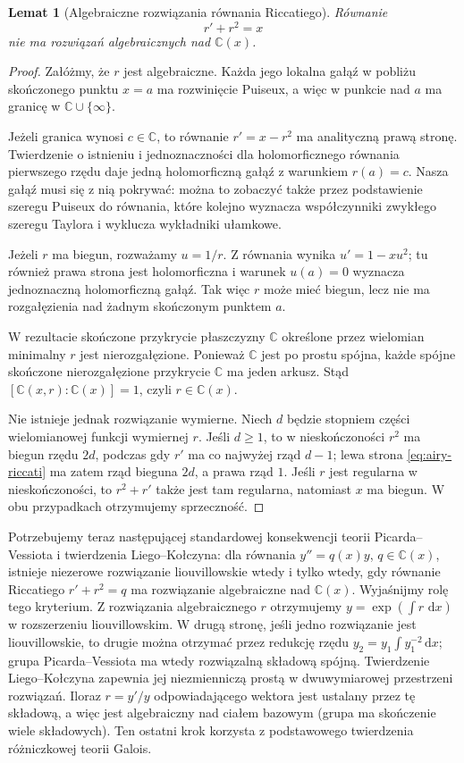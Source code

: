 \documentclass[11pt,a4paper,oneside]{book}
\numberwithin{equation}{section}
\theoremstyle{plain}
\newtheorem{lemat}[twierdzenie]{Lemat}
\theoremstyle{definition}
\theoremstyle{remark}
\newcommand{\C}{\mathbb{C}}
\newcommand{\dd}{\,\mathrm{d}}
\begin{document}
\begin{lemat}[Algebraiczne rozwiązania równania Riccatiego]
Równanie
\begin{equation}\label{eq:airy-riccati}
r'+r^2=x
\end{equation}
nie ma rozwiązań algebraicznych nad $\C(x)$.
\end{lemat}
\begin{proof}
Załóżmy, że $r$ jest algebraiczne. Każda jego lokalna gałąź w pobliżu skończonego punktu $x=a$ ma rozwinięcie Puiseux, a więc w punkcie nad $a$ ma granicę w $\C\cup\{\infty\}$.

Jeżeli granica wynosi $c\in\C$, to równanie $r'=x-r^2$ ma analityczną prawą stronę. Twierdzenie o istnieniu i jednoznaczności dla holomorficznego równania pierwszego rzędu daje jedną holomorficzną gałąź z warunkiem $r(a)=c$. Nasza gałąź musi się z nią pokrywać: można to zobaczyć także przez podstawienie szeregu Puiseux do równania, które kolejno wyznacza współczynniki zwykłego szeregu Taylora i wyklucza wykładniki ułamkowe.

Jeżeli $r$ ma biegun, rozważamy $u=1/r$. Z równania wynika $u'=1-xu^2$; tu również prawa strona jest holomorficzna i warunek $u(a)=0$ wyznacza jednoznaczną holomorficzną gałąź. Tak więc $r$ może mieć biegun, lecz nie ma rozgałęzienia nad żadnym skończonym punktem $a$.

W rezultacie skończone przykrycie płaszczyzny $\C$ określone przez wielomian minimalny $r$ jest nierozgałęzione. Ponieważ $\C$ jest po prostu spójna, każde spójne skończone nierozgałęzione przykrycie $\C$ ma jeden arkusz. Stąd $[\C(x,r):\C(x)]=1$, czyli $r\in\C(x)$.

Nie istnieje jednak rozwiązanie wymierne. Niech $d$ będzie stopniem części wielomianowej funkcji wymiernej $r$. Jeśli $d\ge1$, to w nieskończoności $r^2$ ma biegun rzędu $2d$, podczas gdy $r'$ ma co najwyżej rząd $d-1$; lewa strona \eqref{eq:airy-riccati} ma zatem rząd bieguna $2d$, a prawa rząd $1$. Jeśli $r$ jest regularna w nieskończoności, to $r^2+r'$ także jest tam regularna, natomiast $x$ ma biegun. W obu przypadkach otrzymujemy sprzeczność.
\end{proof}

Potrzebujemy teraz następującej standardowej konsekwencji teorii Picarda--Vessiota i twierdzenia Liego--Kołczyna: dla równania $y''=q(x)y$, $q\in\C(x)$, istnieje niezerowe rozwiązanie liouvillowskie wtedy i tylko wtedy, gdy równanie Riccatiego $r'+r^2=q$ ma rozwiązanie algebraiczne nad $\C(x)$. Wyjaśnijmy rolę tego kryterium. Z rozwiązania algebraicznego $r$ otrzymujemy $y=\exp(\int r\,\dd x)$ w rozszerzeniu liouvillowskim. W drugą stronę, jeśli jedno rozwiązanie jest liouvillowskie, to drugie można otrzymać przez redukcję rzędu $y_2=y_1\int y_1^{-2}\dd x$; grupa Picarda--Vessiota ma wtedy rozwiązalną składową spójną. Twierdzenie Liego--Kołczyna zapewnia jej niezmienniczą prostą w dwuwymiarowej przestrzeni rozwiązań. Iloraz $r=y'/y$ odpowiadającego wektora jest ustalany przez tę składową, a więc jest algebraiczny nad ciałem bazowym (grupa ma skończenie wiele składowych). Ten ostatni krok korzysta z podstawowego twierdzenia różniczkowej teorii Galois.
\end{document}
